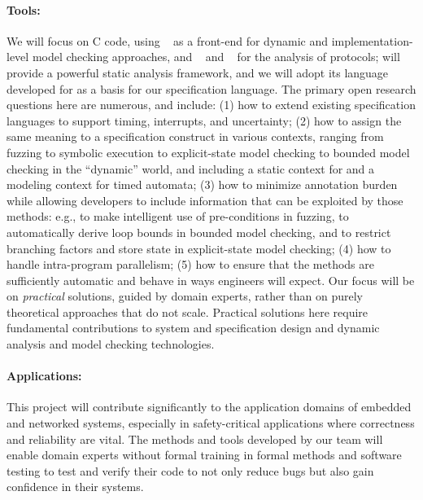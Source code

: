 \paragraph{Tools:} We will focus on C code, using \deepstate~\cite{DeepState}
as a front-end for dynamic and implementation-level model checking approaches, and
\uppaal~\cite{uppaal} and
\prism~\cite{KNP2011:CAV} for the analysis of protocols; \framac will
provide a powerful static analysis framework, and we will adopt its
\acsl language developed for \framac as a basis for our specification language.  The primary open research questions here are numerous, and include:
(1) how to extend existing specification languages to support timing, interrupts,
and uncertainty;
(2) how to assign the same meaning to a specification construct in
  various contexts, ranging from fuzzing to symbolic execution to
  explicit-state model checking to bounded model checking in the
  ``dynamic'' \deepstate world, and including a static context for
  \framac and a modeling context for timed automata;
(3) how to minimize annotation burden while allowing developers to
include information that can be exploited by those methods: e.g., to
make intelligent use of pre-conditions in fuzzing, to automatically
derive loop bounds in bounded model checking, and to restrict
branching factors and store state in explicit-state model checking;
(4) how to handle intra-program parallelism;
(5) how to ensure that the methods are sufficiently automatic
  and behave in ways engineers will expect.
Our focus will be on \emph{practical} solutions, guided by domain experts, rather than on purely theoretical approaches
that do not scale. Practical solutions here require
fundamental contributions to system and specification design and
dynamic analysis and model checking technologies.

\paragraph{Applications:}
This project will contribute significantly to the application domains of embedded and networked systems, especially in safety-critical applications where correctness and reliability are vital.
The  methods and tools 
developed by our team will enable domain experts without formal training in formal methods and software testing to test and verify their code to not only reduce bugs but also gain confidence in their systems.


